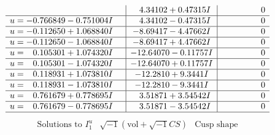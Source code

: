 \documentclass[1p]{elsarticle_modified}
\theoremstyle{definition}
\newcommand{\I}{\sqrt{-1}}
\begin{document}
$$\begin{array}{c|c|c}
 & \phantom{-}4.34102 + 0.47315 I & \phantom{-0.000000 } 0 \\ \hline\begin{aligned}
u &= -0.766849 - 0.751004 I\end{aligned}
 & \phantom{-}4.34102 - 0.47315 I & \phantom{-0.000000 } 0 \\ \hline\begin{aligned}
u &= -0.112650 + 1.068840 I\end{aligned}
 & -8.69417 - 4.47662 I & \phantom{-0.000000 } 0 \\ \hline\begin{aligned}
u &= -0.112650 - 1.068840 I\end{aligned}
 & -8.69417 + 4.47662 I & \phantom{-0.000000 } 0 \\ \hline\begin{aligned}
u &= \phantom{-}0.105301 + 1.074320 I\end{aligned}
 & -12.64070 - 0.11757 I & \phantom{-0.000000 } 0 \\ \hline\begin{aligned}
u &= \phantom{-}0.105301 - 1.074320 I\end{aligned}
 & -12.64070 + 0.11757 I & \phantom{-0.000000 } 0 \\ \hline\begin{aligned}
u &= \phantom{-}0.118931 + 1.073810 I\end{aligned}
 & -12.2810 + 9.3441 I & \phantom{-0.000000 } 0 \\ \hline\begin{aligned}
u &= \phantom{-}0.118931 - 1.073810 I\end{aligned}
 & -12.2810 - 9.3441 I & \phantom{-0.000000 } 0 \\ \hline\begin{aligned}
u &= \phantom{-}0.761679 + 0.778695 I\end{aligned}
 & \phantom{-}3.51871 + 3.54542 I & \phantom{-0.000000 } 0 \\ \hline\begin{aligned}
u &= \phantom{-}0.761679 - 0.778695 I\end{aligned}
 & \phantom{-}3.51871 - 3.54542 I & \phantom{-0.000000 } 0\\
 \hline 
 \end{array}$$\newpage$$\begin{array}{c|c|c}  
\text{Solutions to }I^u_{1}& \I (\text{vol} + \sqrt{-1}CS) & \text{Cusp shape}\\
 \hline 
\begin{aligned}

\end{aligned}
\end{array}$$
\end{document}
